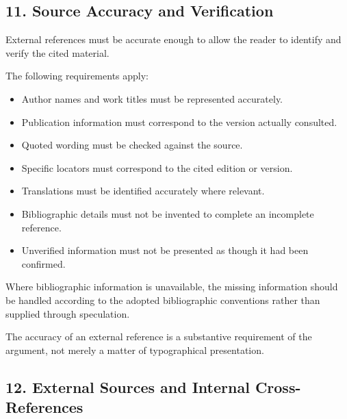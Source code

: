 
\subsection*{11. Source Accuracy and Verification}

External references must
be accurate enough to allow
the reader to identify
and verify the cited material.

The following requirements
apply:

\begin{itemize}
    \item Author names and
    work titles must be
    represented accurately.

    \item Publication information
    must correspond to the
    version actually consulted.

    \item Quoted wording must
    be checked against the
    source.

    \item Specific locators
    must correspond to the
    cited edition or version.

    \item Translations must
    be identified accurately
    where relevant.

    \item Bibliographic details
    must not be invented
    to complete an incomplete
    reference.

    \item Unverified information
    must not be presented
    as though it had been
    confirmed.
\end{itemize}

Where bibliographic information
is unavailable, the missing
information should be handled
according to the adopted
bibliographic conventions
rather than supplied through
speculation.

The accuracy of an external
reference is a substantive
requirement of the argument,
not merely a matter of
typographical presentation.


\subsection*{12. External Sources and
Internal Cross-References}

